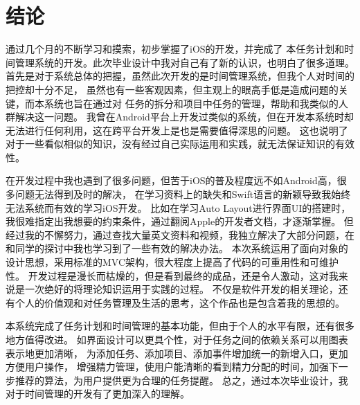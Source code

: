 
\chapter{结论}

通过几个月的不断学习和摸索，初步掌握了iOS的开发，并完成了
本任务计划和时间管理系统的开发。此次毕业设计中我对自己有了新的认识，也明白了很多道理。
首先是对于系统总体的把握，虽然此次开发的是时间管理系统，但我个人对时间的把控却十分不足，
虽然也有一些客观因素，但主观上的眼高手低是造成问题的关键，而本系统也旨在通过对
任务的拆分和项目中任务的管理，帮助和我类似的人群解决这一问题。
我曾在Android平台上开发过类似的系统，但在开发本系统时却无法进行任何利用，这在跨平台开发上是也是需要值得深思的问题。
这也说明了对于一些看似相似的知识，没有经过自己实际运用和实践，就无法保证知识的有效性。

在开发过程中我也遇到了很多问题，但苦于iOS的普及程度远不如Android高，很多问题无法得到及时的解决，
在学习资料上的缺失和Swift语言的新颖导致我始终无法系统而有效的学习iOS开发。
比如在学习Auto Layout进行界面UI的搭建时，我很难指定出我想要的约束条件，通过翻阅Apple的开发者文档，才逐渐掌握。
但经过我的不懈努力，通过查找大量英文资料和视频，我独立解决了大部分问题，在和同学的探讨中我也学习到了一些有效的解决办法。
本次系统运用了面向对象的设计思想，采用标准的MVC架构，很大程度上提高了代码的可重用性和可维护性。
开发过程是漫长而枯燥的，但是看到最终的成品，还是令人激动，这对我来说是一次绝好的将理论知识运用于实践的过程。
不仅是软件开发的相关理论，还有个人的价值观和对任务管理及生活的思考，这个作品也是包含着我的思想的。

本系统完成了任务计划和时间管理的基本功能，但由于个人的水平有限，还有很多地方值得改进。
如界面设计可以更具个性，对于任务之间的依赖关系可以用图表表示地更加清晰，
为添加任务、添加项目、添加事件增加统一的新增入口，更加方便用户操作，
增强精力管理，使用户能清晰的看到精力分配的时间，加强下一步推荐的算法，为用户提供更为合理的任务提醒。
总之，通过本次毕业设计，我对于时间管理的开发有了更加深入的理解。